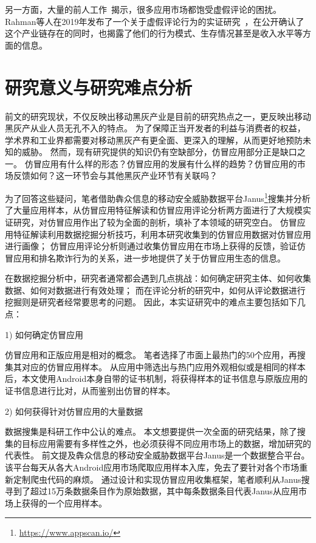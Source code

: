 另一方面，大量的前人工作~\cite{hernandez2019the, xie2014grouptie, zhu2014discovery, hu2019want, chen2017toward, xie2016you, hooi2016fraudar}揭示，很多应用市场都饱受虚假评论的困扰。
Rahman等人在2019年发布了一个关于虚假评论行为的实证研究~\cite{rahman2019art}，在公开确认了这个产业链存在的同时，也揭露了他们的行为模式、生存情况甚至是收入水平等方面的信息。


\section{研究意义与研究难点分析}

前文的研究现状，不仅反映出移动黑灰产业是目前的研究热点之一，更反映出移动黑灰产从业人员无孔不入的特点。
为了保障正当开发者的利益与消费者的权益，学术界和工业界都需要对移动黑灰产有更全面、更深入的理解，从而更好地预防未知的威胁。
然而，现有研究提供的知识仍有空缺部分，仿冒应用部分正是缺口之一。
仿冒应用有什么样的形态？仿冒应用的发展有什么样的趋势？仿冒应用的市场反馈如何？这一环节会与其他黑灰产业环节有关联吗？

为了回答这些疑问，笔者借助犇众信息的移动安全威胁数据平台Janus\footnote{\url{https://www.appscan.io/}}搜集并分析了大量应用样本，从仿冒应用特征解读和仿冒应用评论分析两方面进行了大规模实证研究，对仿冒应用作出了较为全面的剖析，填补了本领域的研究空白。
仿冒应用特征解读利用数据挖掘分析技巧，利用本研究收集到的仿冒应用数据对仿冒应用进行画像；
仿冒应用评论分析则通过收集仿冒应用在市场上获得的反馈，验证仿冒应用和排名欺诈行为的关系，进一步地提供了关于仿冒应用生态的信息。

在数据挖掘分析中，研究者通常都会遇到几点挑战：如何确定研究主体、如何收集数据、如何对数据进行有效处理；
而在评论分析的研究中，如何从评论数据进行挖掘则是研究者经常要思考的问题。
因此，本实证研究中的难点主要包括如下几点：

1)	如何确定仿冒应用

仿冒应用和正版应用是相对的概念。
笔者选择了市面上最热门的50个应用，再搜集其对应的仿冒应用样本。
从应用中筛选出与热门应用外观相似或是相同的样本后，本文使用Android本身自带的证书机制，将获得样本的证书信息与原版应用的证书信息进行比对，从而鉴别出仿冒的样本。

2)	如何获得针对仿冒应用的大量数据

数据搜集是科研工作中公认的难点。
本文想要提供一次全面的研究结果，除了搜集的目标应用需要有多样性之外，也必须获得不同应用市场上的数据，增加研究的代表性。
前文提及犇众信息的移动安全威胁数据平台Janus是一个数据整合平台。该平台每天从各大Android应用市场爬取应用样本入库，免去了要针对各个市场重新定制爬虫代码的麻烦。
通过设计和实现仿冒应用收集框架\mytool，笔者顺利从Janus搜寻到了超过15万条数据条目作为原始数据，其中每条数据条目代表Janus从应用市场上获得的一个应用样本。


